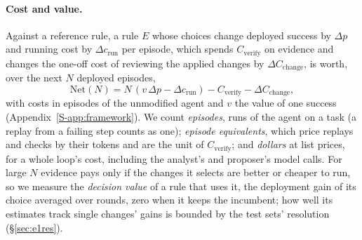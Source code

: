 \documentclass[11pt]{article}
\begin{document}
\paragraph{Cost and value.} Against a reference rule, a rule $E$ whose choices change deployed success by $\Delta p$ and running cost by $\Delta c_{\mathrm{run}}$ per episode, which spends $C_{\mathrm{verify}}$ on evidence and changes the one-off cost of reviewing the applied changes by $\Delta C_{\mathrm{change}}$, is worth, over the next $N$ deployed episodes,
\begin{equation}
\mathrm{Net}(N)=N\,(v\,\Delta p-\Delta c_{\mathrm{run}})-C_{\mathrm{verify}}-\Delta C_{\mathrm{change}},
\label{eq:net}
\end{equation}
with costs in episodes of the unmodified agent and $v$ the value of one success (Appendix~\ref*{S-app:framework}). We count \emph{episodes}, runs of the agent on a task (a replay from a failing step counts as one); \emph{episode equivalents}, which price replays and checks by their tokens and are the unit of $C_{\mathrm{verify}}$; and \emph{dollars} at list prices, for a whole loop's cost, including the analyst's and proposer's model calls. For large $N$ evidence pays only if the changes it selects are better or cheaper to run, so we measure the \emph{decision value} of a rule that uses it, the deployment gain of its choice averaged over rounds, zero when it keeps the incumbent; how well its estimates track single changes' gains is bounded by the test sets' resolution (\S\ref{sec:e1res}).
\end{document}
